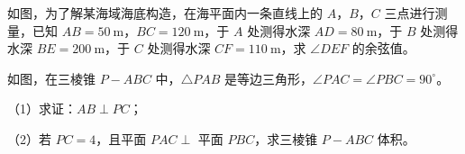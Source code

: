 \Needspace{0.4\textheight}
\begin{question}
如图，为了解某海域海底构造，在海平面内一条直线上的 $A$，$B$，$C$ 三点进行测量，已知 $AB=50\ \mathrm m$，$BC=120\ \mathrm m$，于 $A$ 处测得水深 $AD=80\ \mathrm m$，于 $B$ 处测得水深 $BE=200\ \mathrm m$，于 $C$ 处测得水深 $CF=110\ \mathrm m$，求 $\angle DEF$ 的余弦值。
\nopagebreak[4]
\begin{center}\end{center}
\nopagebreak[4]
\Needspace{0.4\textheight}
\end{question}
\begin{question}
如图，在三棱锥 $P-ABC$ 中，$\triangle PAB$ 是等边三角形，$\angle PAC=\angle PBC=90^\circ$。

（1）求证：$AB\perp PC$；

（2）若 $PC=4$，且平面 $PAC\perp$ 平面 $PBC$，求三棱锥 $P-ABC$ 体积。
\nopagebreak[4]
\begin{center}\end{center}
\nopagebreak[4]
\Needspace{0.4\textheight}
\end{question}
